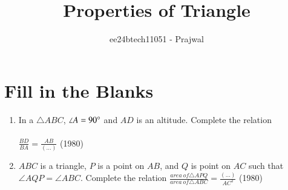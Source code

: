 \documentclass[journal,12pt,onecolumn]{IEEEtran}
\theoremstyle{remark}
\begin{document}

\vspace{3cm}

\title{Properties of Triangle}
\author{ee24btech11051 - Prajwal}
\maketitle
\newpage
\bigskip

\renewcommand{\thefigure}{\theenumi}
\renewcommand{\thetable}{\theenumi}
\section{Fill in the Blanks}
\begin{enumerate}
    \item In a $\triangle ABC$, $\angle A=90\degree$ and $AD$ is an altitude. Complete the relation\\
    \\
    $\frac{BD}{BA} = \frac{AB}{(\dots)}$
    \hfill (1980)
    
    \item $ABC$ is a triangle, $P$ is a point on $AB$, and $Q$ is point on $AC$ such that $\angle AQP = \angle ABC$. Complete the relation
    $\frac{area\ of \triangle APQ}{area\ of \triangle ABC} =\frac{(\dots)}{AC^2}$
    \hfill (1980)
    

\end{enumerate}
\end{document}
